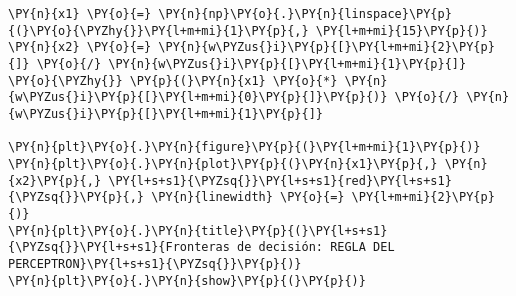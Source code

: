 \begin{tcolorbox}[breakable, size=fbox, boxrule=1pt, pad at break*=1mm,colback=cellbackground, colframe=cellborder]
\begin{Verbatim}[commandchars=\\\{\}]
\PY{n}{x1} \PY{o}{=} \PY{n}{np}\PY{o}{.}\PY{n}{linspace}\PY{p}{(}\PY{o}{\PYZhy{}}\PY{l+m+mi}{1}\PY{p}{,} \PY{l+m+mi}{15}\PY{p}{)}
\PY{n}{x2} \PY{o}{=} \PY{n}{w\PYZus{}i}\PY{p}{[}\PY{l+m+mi}{2}\PY{p}{]} \PY{o}{/} \PY{n}{w\PYZus{}i}\PY{p}{[}\PY{l+m+mi}{1}\PY{p}{]} \PY{o}{\PYZhy{}} \PY{p}{(}\PY{n}{x1} \PY{o}{*} \PY{n}{w\PYZus{}i}\PY{p}{[}\PY{l+m+mi}{0}\PY{p}{]}\PY{p}{)} \PY{o}{/} \PY{n}{w\PYZus{}i}\PY{p}{[}\PY{l+m+mi}{1}\PY{p}{]}

\PY{n}{plt}\PY{o}{.}\PY{n}{figure}\PY{p}{(}\PY{l+m+mi}{1}\PY{p}{)}
\PY{n}{plt}\PY{o}{.}\PY{n}{plot}\PY{p}{(}\PY{n}{x1}\PY{p}{,} \PY{n}{x2}\PY{p}{,} \PY{l+s+s1}{\PYZsq{}}\PY{l+s+s1}{red}\PY{l+s+s1}{\PYZsq{}}\PY{p}{,} \PY{n}{linewidth} \PY{o}{=} \PY{l+m+mi}{2}\PY{p}{)}
\PY{n}{plt}\PY{o}{.}\PY{n}{title}\PY{p}{(}\PY{l+s+s1}{\PYZsq{}}\PY{l+s+s1}{Fronteras de decisión: REGLA DEL PERCEPTRON}\PY{l+s+s1}{\PYZsq{}}\PY{p}{)}
\PY{n}{plt}\PY{o}{.}\PY{n}{show}\PY{p}{(}\PY{p}{)}
\end{Verbatim}
\end{tcolorbox}

    \begin{center}
    \end{center}
    { \hspace*{\fill} \\}
    
    \begin{center}
    \end{center}
    { \hspace*{\fill} \\}
    
